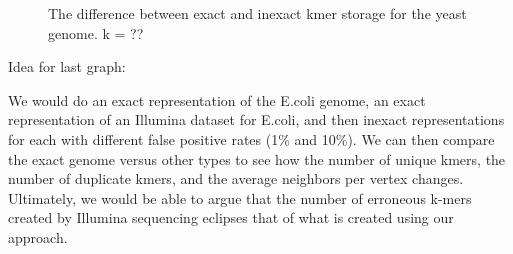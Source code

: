 \documentclass[12pt]{article} \usepackage{simplemargins}
\begin{document}
\begin{figure}
\caption{The difference between exact and inexact kmer storage for the
yeast genome. k = ??}
\end{figure}

Idea for last graph:

We would do an exact representation of the E.coli genome, an exact 
representation of an Illumina dataset for E.coli, and then inexact
representations for each with different false positive rates (1\% and
10\%). We can then compare the exact genome versus other types to see
how the number of unique kmers, the number of duplicate kmers, and the
average neighbors per vertex changes. Ultimately, we would be able to
argue that the number of erroneous k-mers created by Illumina
sequencing eclipses that of what is created using our approach.
\end{document}
